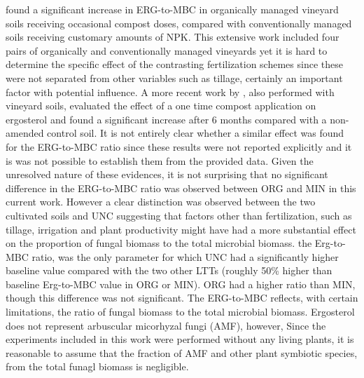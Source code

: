	\citet{probst2008} found a significant increase in ERG-to-MBC in organically managed vineyard soils receiving occasional compost doses, compared with conventionally managed soils receiving customary amounts of NPK. This extensive work included four pairs of organically and conventionally managed vineyards yet it is hard to determine the specific effect of the contrasting fertilization schemes since these were not separated from other variables such as tillage, certainly an important factor with potential influence. A more recent work by \citet{mackie2015} , also performed with vineyard soils, evaluated the effect of a one time compost application on ergosterol and found a significant increase after 6 months compared with a non-amended control soil. It is not entirely clear whether a similar effect was found for the ERG-to-MBC ratio since these results were not reported explicitly and it is was not possible to establish them from the provided data.
	Given the unresolved nature of these evidences, it is not surprising that no significant difference in the ERG-to-MBC ratio was observed between ORG and MIN in this current work. However a clear distinction was observed between the two cultivated soils and UNC suggesting that factors other than fertilization, such as tillage, irrigation and plant productivity might have had a more substantial effect on the proportion of fungal biomass to the total microbial biomass.
	the Erg-to-MBC ratio, was the only parameter for which UNC had a significantly higher baseline value compared with the two other LTTs (roughly 50\% higher than baseline Erg-to-MBC value in ORG or MIN).
	ORG had a higher ratio than MIN, though this difference was not significant. The ERG-to-MBC reflects, with certain limitations, the ratio of fungal biomass to the total microbial biomass. Ergosterol does not represent arbuscular micorhyzal fungi (AMF), however, Since the experiments included in this work were performed without any living plants, it is reasonable to assume that the fraction of AMF and other plant symbiotic species, from the total funagl biomass is negligible.
